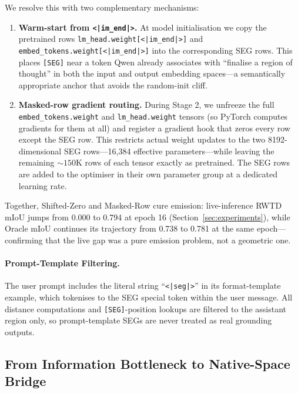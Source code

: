 \documentclass{article}
\begin{document}
We resolve this with two complementary mechanisms:
\begin{enumerate}
    \item \textbf{Warm-start from \texttt{<|im\_end|>}.} At model initialisation we copy the pretrained rows \texttt{lm\_head.weight[<|im\_end|>]} and \texttt{embed\_tokens.weight[<|im\_end|>]} into the corresponding SEG rows. This places \texttt{[SEG]} near a token Qwen already associates with ``finalise a region of thought'' in both the input and output embedding spaces---a semantically appropriate anchor that avoids the random-init cliff.
    \item \textbf{Masked-row gradient routing.} During Stage 2, we unfreeze the full \texttt{embed\_tokens.weight} and \texttt{lm\_head.weight} tensors (so PyTorch computes gradients for them at all) and register a gradient hook that zeros every row except the SEG row. This restricts actual weight updates to the two 8192-dimensional SEG rows---16{,}384 effective parameters---while leaving the remaining ${\sim}150$K rows of each tensor exactly as pretrained. The SEG rows are added to the optimiser in their own parameter group at a dedicated learning rate.
\end{enumerate}

Together, Shifted-Zero and Masked-Row cure emission: live-inference RWTD mIoU jumps from 0.000 to 0.794 at epoch 16 (Section~\ref{sec:experiments}), while Oracle mIoU continues its trajectory from 0.738 to 0.781 at the same epoch---confirming that the live gap was a pure emission problem, not a geometric one.

\paragraph{Prompt-Template Filtering.}
The user prompt includes the literal string ``\texttt{<|seg|>}'' in its format-template example, which tokenises to the SEG special token within the user message. All distance computations and \texttt{[SEG]}-position lookups are filtered to the assistant region only, so prompt-template SEGs are never treated as real grounding outputs.

\subsection{From Information Bottleneck to Native-Space Bridge}
\label{sec:drift}
\end{document}
